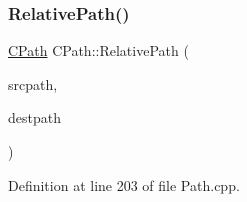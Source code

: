 \subsubsection{\texorpdfstring{Relative\+Path()}{RelativePath()}}
{\footnotesize\ttfamily \hyperlink{classCPath}{C\+Path} C\+Path\+::\+Relative\+Path (\begin{DoxyParamCaption}\item[{const \hyperlink{classCPath}{C\+Path} \&}]{srcpath,  }\item[{const \hyperlink{classCPath}{C\+Path} \&}]{destpath }\end{DoxyParamCaption})\hspace{0.3cm}{\ttfamily [static]}}



Definition at line 203 of file Path.\+cpp.


